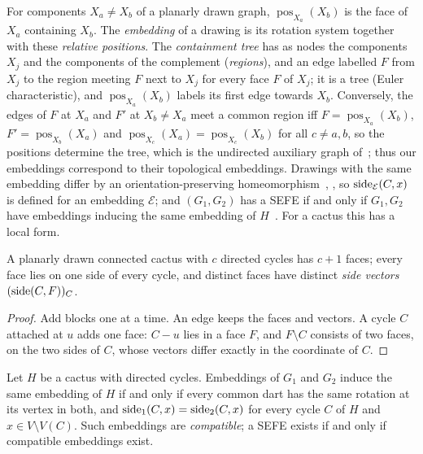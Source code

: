For components $X_a\neq X_b$ of a planarly drawn graph,
$\operatorname{pos}_{X_a}(X_b)$ is the face of $X_a$ containing $X_b$. The
\emph{embedding} of a drawing is its rotation system together with these
\emph{relative positions}. The \emph{containment tree} has as nodes the
components $X_j$ and the components of the complement (\emph{regions}), and
an edge labelled $F$ from $X_j$ to the region meeting $F$ next to $X_j$ for
every face $F$ of $X_j$; it is a tree (Euler characteristic), and
$\operatorname{pos}_{X_a}(X_b)$ labels its first edge towards $X_b$.
Conversely, the edges of $F$ at $X_a$ and $F'$ at $X_b\neq X_a$ meet a common
region iff $F=\operatorname{pos}_{X_a}(X_b)$,
$F'=\operatorname{pos}_{X_b}(X_a)$ and $\operatorname{pos}_{X_c}(X_a)=
\operatorname{pos}_{X_c}(X_b)$ for all $c\neq a,b$, so the positions
determine the tree, which is the undirected auxiliary graph
of~\cite[Sections~4--5]{JS09}; thus our embeddings correspond to their
topological embeddings. Drawings with the same embedding
differ by an orientation-preserving homeomorphism~\cite[Chapter~3]{MT01},
\cite{RS72}, so $\operatorname{side}_{\mathcal E}(C,x)$ is defined for an embedding
$\mathcal E$; and $(G_1,G_2)$ has a SEFE if and only if $G_1,G_2$ have
embeddings inducing the same embedding of $H$~\cite[Theorem~4]{JS09}. For a
cactus this has a local form.

\begin{lemma}\label{lem:v4-faces}
A planarly drawn connected cactus with $c$ directed cycles has $c+1$ faces;
every face lies on one side of every cycle, and distinct faces have
distinct \emph{side vectors} $(\operatorname{side}(C,F))_C$.
\end{lemma}

\begin{proof}
Add blocks one at a time. An edge keeps the faces and vectors. A cycle $C$
attached at $u$ adds one face: $C-u$ lies in a face $F$, and $F\setminus C$
consists of two faces, on the two sides of $C$, whose vectors differ exactly
in the coordinate of $C$.
\end{proof}

\begin{lemma}\label{lem:v4-charact}
Let $H$ be a cactus with directed cycles. Embeddings of $G_1$ and $G_2$
induce the same embedding of $H$ if and only if every common dart has the
same rotation at its vertex in both, and $\operatorname{side}_1(C,x)=\operatorname{side}_2(C,x)$ for
every cycle $C$ of $H$ and $x\in V\setminus V(C)$. Such embeddings are
\emph{compatible}; a SEFE exists if and only if compatible embeddings exist.
\end{lemma}

